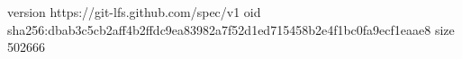 version https://git-lfs.github.com/spec/v1
oid sha256:dbab3c5cb2aff4b2ffdc9ea83982a7f52d1ed715458b2e4f1bc0fa9ecf1eaae8
size 502666
